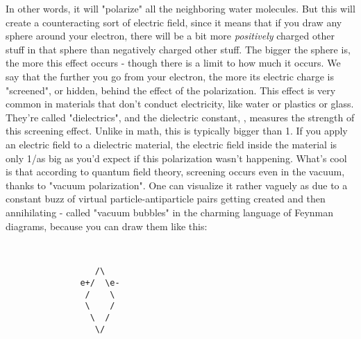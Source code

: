In other words, it will "polarize" all the neighboring water molecules.
But this will create a counteracting sort of electric field, since it
means that if you draw any sphere around your electron, there will be a
bit more \emph{positively} charged other stuff in that sphere than negatively
charged other stuff.  The bigger the sphere is, the more this effect
occurs - though there is a limit to how much it occurs.  We say that
the further you go from your electron, the more its electric charge is
"screened", or hidden, behind the effect of the polarization.
This effect is very common in materials that don't conduct electricity,
like water or plastics or glass.  They're called "dielectrics", and the
dielectric constant, \epsilon , measures the strength of this screening
effect.  Unlike in math, this \epsilon  is typically bigger than 1.  If
you apply an electric field to a dielectric material, the electric field
inside the material is only 1/\epsilon  as big as you'd expect if this
polarization wasn't happening.  
What's cool is that according to quantum field theory, screening occurs
even in the vacuum, thanks to "vacuum polarization".  One can visualize
it rather vaguely as due to a constant buzz of virtual particle-antiparticle
pairs getting created and then annihilating - called "vacuum bubbles"
in the charming language of Feynman diagrams, because you can draw them
like this:

\begin{verbatim}


                  /\
               e+/  \e-
                /    \
                \    /
                 \  /
                  \/

\end{verbatim}
    
